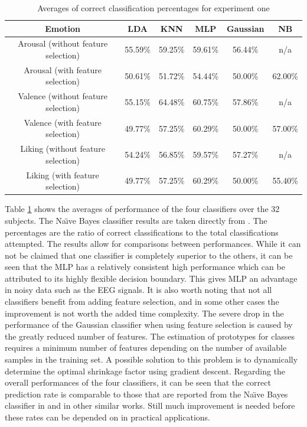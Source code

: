 \documentclass[12pt, a4paper, fleqn]{memoir}%
\begin{document}
\begin{table}[!h]
	\begin{tabular}{| c | c | c | c | c | c |}
		\hline \hline
		Emotion					& LDA	  & KNN	    & MLP     & Gaussian & NB      \\
		\hline \hline
		Arousal (without feature selection)	& 55.59\% & 59.25\% & 59.61\% & 56.44\%  & n/a     \\ \hline
		Arousal (with feature selection)        & 50.61\% & 51.72\% & 54.44\% & 50.00\%  & 62.00\% \\ \hline
		\hline
		Valence (without feature selection)     & 55.15\% & 64.48\% & 60.75\% & 57.86\%  & n/a     \\ \hline
		Valence (with feature selection)	& 49.77\% & 57.25\% & 60.29\% & 50.00\%	 & 57.00\% \\ \hline
		\hline
		Liking  (without feature selection)	& 54.24\% & 56.85\% & 59.57\% & 57.27\%  & n/a     \\ \hline
		Liking  (with feature selection)	& 49.77\% & 57.25\% & 60.29\% & 50.00\%  & 55.40\% \\ \hline
		\hline
	\end{tabular}
	\caption{Averages of correct classification percentages for experiment one}
	\label{table:exp1}
\end{table}

Table \ref{table:exp1} shows the averages of performance of the four classifiers over the 32 subjects. The Na\"{\i}ve Bayes classifier results are taken directly from \cite{koelstra2012deap}. The percentages are the ratio of correct classifications to the total classifications attempted. The results allow for comparisons between performances. While it can not be claimed that one classifier is completely superior to the others, it can be seen that the MLP has a relatively consistent high performance which can be attributed to its highly flexible decision boundary. This gives MLP an advantage in noisy data such as the EEG signals. It is also worth noting that not all classifiers benefit from adding feature selection, and in some other cases the improvement is not worth the added time complexity. The severe drop in the performance of the Gaussian classifier when using feature selection is caused by the greatly reduced number of features. The estimation of prototypes for classes requires a minimum number of features depending on the number of available samples in the training set. A possible solution to this problem is to dynamically determine the optimal shrinkage factor using gradient descent. Regarding the overall performances of the four classifiers, it can be seen that the correct prediction rate is comparable to those that are reported from the Na\"{\i}ve Bayes classifier in \cite{koelstra2012deap} and in other similar works. Still much improvement is needed before these rates can be depended on in practical applications.
\end{document}
